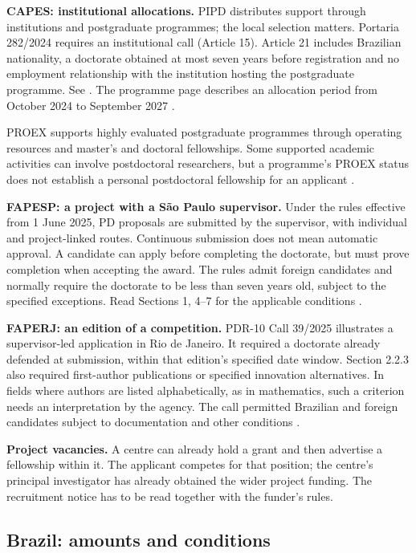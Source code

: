 \textbf{CAPES: institutional allocations.}
PIPD distributes support through institutions
and
postgraduate programmes; the local selection
matters.
Portaria 282/2024 requires an institutional
call
(Article 15). Article 21 includes Brazilian
nationality,
a doctorate obtained at most seven years
before
registration and no employment relationship
with the
institution hosting the postgraduate
programme.
See \cite{gsf-capes-pipd}.
The programme page describes an allocation
period from
October 2024 to September 2027
\cite{gsf-capes-pipd-period}.

PROEX supports highly evaluated postgraduate
programmes
through operating resources and master's and
doctoral
fellowships. Some supported academic
activities can
involve postdoctoral researchers, but a
programme's
PROEX status does not establish a personal
postdoctoral
fellowship for an applicant
\cite{gsf-capes-proex}.

\textbf{FAPESP: a project with a São Paulo
supervisor.}
Under the rules effective from 1 June 2025,
PD proposals
are submitted by the supervisor, with
individual and
project-linked routes. Continuous submission
does not
mean automatic approval.
A candidate can apply before completing the
doctorate,
but must prove completion when accepting the
award.
The rules admit foreign candidates and
normally require
the doctorate to be less than seven years
old, subject
to the specified exceptions.
Read Sections 1, 4--7 for the applicable
conditions
\cite{gsf-fapesp-pd}.

\textbf{FAPERJ: an edition of a competition.}
PDR-10 Call 39/2025 illustrates a
supervisor-led
application in Rio de Janeiro.
It required a doctorate already defended at
submission,
within that edition's specified date window.
Section 2.2.3 also required first-author
publications
or specified innovation alternatives.
In fields where authors are listed
alphabetically, as in mathematics, such a
criterion needs an interpretation by the
agency.
The call permitted Brazilian and foreign
candidates
subject to documentation and other conditions
\cite[Sections 2 and 7]{gsf-faperj-pdr10}.

\textbf{Project vacancies.}
A centre can already hold a grant and then
advertise
a fellowship within it. The applicant
competes for
that position; the centre's principal
investigator
has already obtained the wider project
funding.
The recruitment notice has to be read together
with the funder's rules.

\subsection{Brazil: amounts and conditions}
\label{section-gsf-brazil-amounts}

